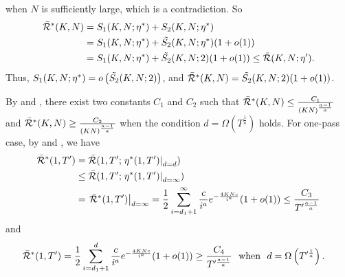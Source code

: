     when $N$ is sufficiently large, which is a contradiction.
    So
    \begin{align*}
        \Bar{\mathcal{R}}^*(K, N)&=S_1(K, N;\eta^*)+S_2(K, N;\eta^*) \\
        &=S_1(K, N;\eta^*)+\Tilde{S_2}(K, N;\eta^*)(1+o(1)) \\
        &=S_1(K, N;\eta^*)+\Tilde{S_2}(K, N;2)(1+o(1))\leq\Bar{\mathcal{R}}(K, N;\eta').
    \end{align*}
    Thus, $S_1(K, N;\eta^*)=o\left(\Tilde{S_2}(K, N;2)\right)$, and $\Bar{\mathcal{R}}^*(K, N)=\Tilde{S_2}(K, N;2)(1+o(1))$.
    
By  and , there exist two constants $C_1$ and $C_2$ such that $\Bar{\mathcal{R}}^*(K, N)\leq \frac{C_1}{(KN)^{\frac{a-1}{a}}}$ and $\Bar{\mathcal{R}}^*(K, N)\geq \frac{C_2}{(KN)^{\frac{a-1}{a}}}$ when the condition $d = \Omega(T^{\frac{1}{a}})$ holds. For one-pass case, by  and , we have
\begin{align}
    \Bar{\mathcal{R}}^*(1, T')&=\Bar{\mathcal{R}}(1, T';\left.\eta^*(1,T')\right|_{d=d}) \notag\\&\leq\Bar{\mathcal{R}}(1, T';\left.\eta^*(1,T')\right|_{d=\infty}) \notag\\
    &= \left.\Bar{\mathcal{R}}^*(1, T')\right|_{d = \infty} =\frac{1}{2}\sum_{i=d_1+1}^{\infty}\frac{c}{i^a}e^{-\frac{4KNc}{i^a}}(1+o(1)) \leq \frac{C_3}{T'^{\frac{a-1}{a}}} \label{ineq:one-hot-small-K-upper-bound}
\end{align}
and
\begin{align}
    \Bar{\mathcal{R}}^*(1, T')&= \frac{1}{2}\sum_{i=d_1+1}^{d}\frac{c}{i^a}e^{-\frac{4KNc}{i^a}}(1+o(1))\geq \frac{C_4}{T'^{\frac{a-1}{a}}} ~~\text{when} ~~d = \Omega\left(T'^{\frac{1}{a}}\right). \label{ineq:one-hot-small-K-lower-bound}
\end{align}


